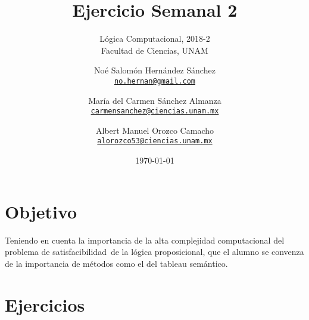 \documentclass[paper=letter, fontsize=12pt]{scrartcl}
\title{Ejercicio Semanal 2}
\subtitle{
  Lógica Computacional, 2018-2\\
  Facultad de Ciencias, UNAM
}
\author{
  \normalsize
  Noé Salomón Hernández Sánchez\\
  \normalsize
  \texttt{\href{mailto:no.hernan@gmail.com}{no.hernan@gmail.com}}
  \and
  \normalsize
  María del Carmen Sánchez Almanza\\
  \normalsize
  \texttt{\href{mailto:carmensanchez@ciencias.unam.mx}{carmensanchez@ciencias.unam.mx}}
  \and
  \normalsize
  Albert Manuel Orozco Camacho\\
  \normalsize
  \texttt{\href{mailto:alorozco53@ciencias.unam.mx}{alorozco53@ciencias.unam.mx}}
}
\date{\today}
\begin{document}
\maketitle

\section{Objetivo}

\noindent
Teniendo en cuenta la importancia de la alta complejidad computacional del problema de satisfacibilidad\
de la lógica proposicional, que el alumno se convenza de la importancia de métodos como el del tableau semántico.

\section{Ejercicios}
\end{document}

